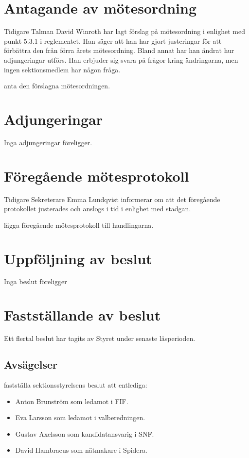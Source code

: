 \documentclass[hidelinks]{sektionsmote}
\begin{document}
\section{Antagande av mötesordning}
Tidigare Talman David Winroth har lagt förslag på mötesordning i enlighet med punkt 5.3.1 i reglementet.
Han säger att han har gjort justeringar för att förbättra den från förra årets mötesordning.
Bland annat har han ändrat hur adjungeringar utförs.
Han erbjuder sig svara på frågor kring ändringarna, men ingen sektionsmedlem har någon fråga.
\begin{beslut}
    \item anta den förslagna mötesordningen.
\end{beslut}

\section{Adjungeringar}
Inga adjungeringar föreligger.


\section{Föregående mötesprotokoll}
Tidigare Sekreterare Emma Lundqvist informerar om att det föregående protokollet justerades och anslogs i tid i enlighet med stadgan.
\begin{beslut}
    \item lägga föregående mötesprotokoll till handlingarna. 
\end{beslut}


\section{Uppföljning av beslut}
Inga beslut föreligger


\section{Fastställande av beslut}
Ett flertal beslut har tagits av Styret under senaste läsperioden.

\subsection{Avsägelser}
\begin{beslut}
    \item fastställa sektionsstyrelsens beslut att entlediga:
    \begin{itemize}
        \item Anton Brunström som ledamot i FIF.
        \item Eva Larsson som ledamot i valberedningen.
        \item Gustav Axelsson som kandidatansvarig i SNF.
        \item David Hambraeus som nätmakare i Spidera.
    \end{itemize}
\end{beslut}
\end{document}
